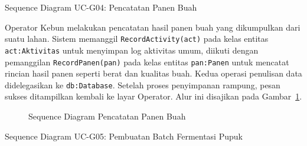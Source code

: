 \newpage

\item{Sequence Diagram UC-G04: Pencatatan Panen Buah}

Operator Kebun melakukan pencatatan hasil panen buah yang dikumpulkan dari suatu lahan. 
Sistem memanggil \texttt{RecordActivity(act)} pada kelas entitas \texttt{act:Aktivitas} untuk menyimpan 
log aktivitas umum, diikuti dengan pemanggilan \texttt{RecordPanen(pan)} pada kelas entitas \texttt{pan:Panen} 
untuk mencatat rincian hasil panen seperti berat dan kualitas buah. Kedua operasi penulisan data didelegasikan ke 
\texttt{db:Database}. Setelah proses penyimpanan rampung, pesan sukses ditampilkan kembali ke layar Operator. 
Alur ini disajikan pada Gambar~\ref{fig:seq_ucg04_panen}.

\begin{figure}[htbp]
\centering
{}
\caption{Sequence Diagram Pencatatan Panen Buah}
\label{fig:seq_ucg04_panen}
\end{figure}

\newpage

\item{Sequence Diagram UC-G05: Pembuatan Batch Fermentasi Pupuk}

